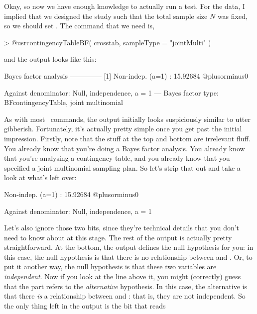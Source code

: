 \noindent
Okay, so now we have enough knowledge to actually run a test. For the  data, I implied that we designed the study such that the total sample size $N$ was fixed, so we should set . The command that we need is,
\begin{rblock1}
> @usr{contingencyTableBF( crosstab, sampleType = "jointMulti" )}
\end{rblock1}
and the output looks like this:
\begin{rblock1}
Bayes factor analysis
--------------
[1] Non-indep. (a=1) : 15.92684 @plusorminus0%

Against denominator:
  Null, independence, a = 1 
---
Bayes factor type: BFcontingencyTable, joint multinomial
\end{rblock1}
As with most \R\ commands, the output initially looks suspiciously similar to utter gibberish. Fortunately, it's actually pretty simple once you get past the initial impression. Firstly, note that the stuff at the top and bottom are irrelevant fluff. You already know that you're doing a Bayes factor analysis. You already know that you're analysing a contingency table, and you already know that you specified a joint multinomial sampling plan. So let's strip that out and take a look at what's left over:
\begin{rblock1} 
[1] Non-indep. (a=1) : 15.92684 @plusorminus0%

Against denominator:
  Null, independence, a = 1 
\end{rblock1}
Let's also ignore those two  bits, since they're technical details that you don't need to know about at this stage. The rest of the output is actually pretty straightforward. At the bottom, the output defines the null hypothesis for you: in this case, the null hypothesis is that there is no relationship between  and . Or, to put it another way, the null hypothesis is that these two variables are {\it independent}. Now if you look at the line above it, you might (correctly) guess that the  part refers to the {\it alternative} hypothesis. In this case, the alternative is that there {\it is} a relationship between  and : that is, they are not independent. So the only thing left in the output is the bit that reads
